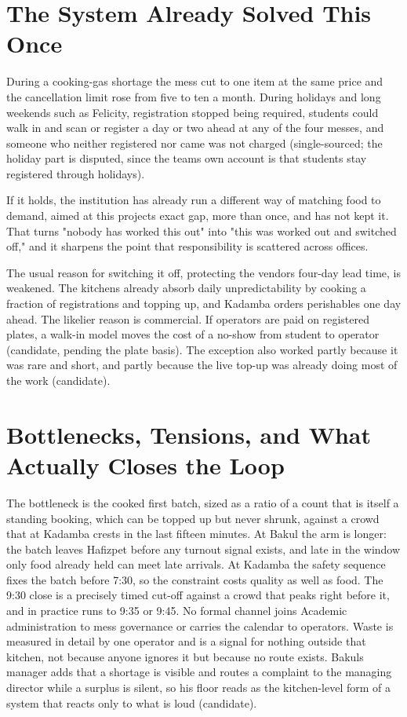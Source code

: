\documentclass[
  10pt,
  table]{article}
\begin{document}
\section{The System Already Solved This Once}\label{the-system-already-solved-this-once}

During a cooking-gas shortage the mess cut to one item at the same price and the cancellation limit rose from five to ten a month. During holidays and long weekends such as Felicity, registration stopped being required, students could walk in and scan or register a day or two ahead at any of the four messes, and someone who neither registered nor came was not charged (single-sourced; the holiday part is disputed, since the team\textquotesingle s own account is that students stay registered through holidays).

If it holds, the institution has already run a different way of matching food to demand, aimed at this project\textquotesingle s exact gap, more than once, and has not kept it. That turns "nobody has worked this out" into "this was worked out and switched off," and it sharpens the point that responsibility is scattered across offices.

The usual reason for switching it off, protecting the vendor\textquotesingle s four-day lead time, is weakened. The kitchens already absorb daily unpredictability by cooking a fraction of registrations and topping up, and Kadamba orders perishables one day ahead. The likelier reason is commercial. If operators are paid on registered plates, a walk-in model moves the cost of a no-show from student to operator (candidate, pending the plate basis). The exception also worked partly because it was rare and short, and partly because the live top-up was already doing most of the work (candidate).

\section{Bottlenecks, Tensions, and What Actually Closes the Loop}\label{bottlenecks-tensions-and-what-actually-closes-the-loop}

The bottleneck is the cooked first batch, sized as a ratio of a count that is itself a standing booking, which can be topped up but never shrunk, against a crowd that at Kadamba crests in the last fifteen minutes. At Bakul the arm is longer: the batch leaves Hafizpet before any turnout signal exists, and late in the window only food already held can meet late arrivals. At Kadamba the safety sequence fixes the batch before 7:30, so the constraint costs quality as well as food. The 9:30 close is a precisely timed cut-off against a crowd that peaks right before it, and in practice runs to 9:35 or 9:45. No formal channel joins Academic administration to mess governance or carries the calendar to operators. Waste is measured in detail by one operator and is a signal for nothing outside that kitchen, not because anyone ignores it but because no route exists. Bakul\textquotesingle s manager adds that a shortage is visible and routes a complaint to the managing director while a surplus is silent, so his floor reads as the kitchen-level form of a system that reacts only to what is loud (candidate).
\end{document}
